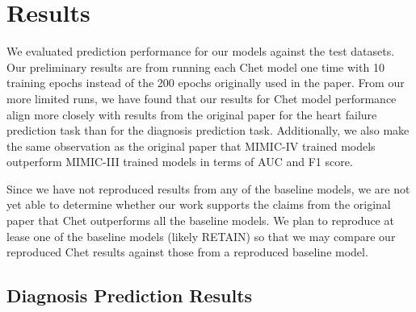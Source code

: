 \documentclass[11pt,a4paper,fleqn]{article}
\begin{document}
\section{Results}

We evaluated prediction performance for our models against the test datasets.
Our preliminary results are from running each Chet model one time with 10 training
epochs instead of the 200 epochs originally used in the paper. From our more
limited runs, we have found that our results for Chet model performance align
more closely with results from the original paper for the heart failure
prediction task than for the diagnosis prediction task. Additionally, we also
make the same observation as the original paper that MIMIC-IV trained models
outperform MIMIC-III trained models in terms of AUC and F1 score.

Since we have not reproduced results from any of the baseline models, we are not
yet able to determine whether our work supports the claims from the original
paper that Chet outperforms all the baseline models. We plan to reproduce at
lease one of the baseline models (likely RETAIN) so that we may compare our
reproduced Chet results against those from a reproduced baseline model.

\subsection{Diagnosis Prediction Results}
\end{document}
